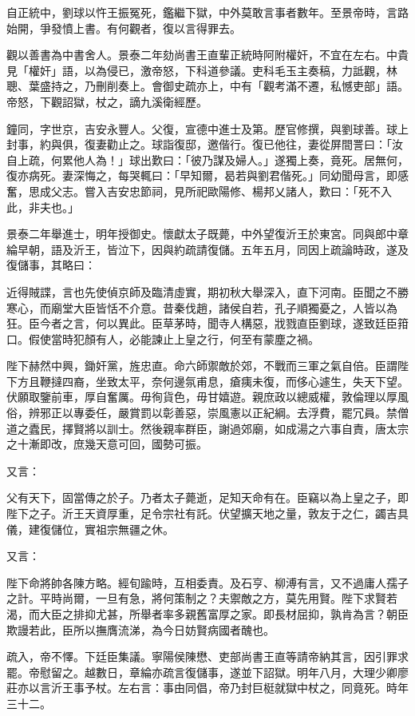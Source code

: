 \begin{pinyinscope}
自正統中，劉球以忤王振冤死，鑑繼下獄，中外莫敢言事者數年。至景帝時，言路始開，爭發憤上書。有何觀者，復以言得罪去。

觀以善書為中書舍人。景泰二年劾尚書王直輩正統時阿附權奸，不宜在左右。中貴見「權奸」語，以為侵已，激帝怒，下科道參議。吏科毛玉主奏稿，力詆觀，林聰、葉盛持之，乃刪削奏上。會御史疏亦上，中有「觀考滿不遷，私憾吏部」語。帝怒，下觀詔獄，杖之，謫九溪衛經歷。

鐘同，字世京，吉安永豐人。父復，宣德中進士及第。歷官修撰，與劉球善。球上封事，約與俱，復妻勸止之。球詣復邸，邀偕行。復已他往，妻從屏間詈曰：「汝自上疏，何累他人為！」球出歎曰：「彼乃謀及婦人。」遂獨上奏，竟死。居無何，復亦病死。妻深悔之，每哭輒曰：「早知爾，曷若與劉君偕死。」同幼聞母言，即感奮，思成父志。嘗入吉安忠節祠，見所祀歐陽修、楊邦乂諸人，歎曰：「死不入此，非夫也。」

景泰二年舉進士，明年授御史。懷獻太子既薨，中外望復沂王於東宮。同與郎中章綸早朝，語及沂王，皆泣下，因與約疏請復儲。五年五月，同因上疏論時政，遂及復儲事，其略曰：

近得賊諜，言也先使偵京師及臨清虛實，期初秋大舉深入，直下河南。臣聞之不勝寒心，而廟堂大臣皆恬不介意。昔秦伐趙，諸侯自若，孔子順獨憂之，人皆以為狂。臣今者之言，何以異此。臣草茅時，聞寺人構惡，戕戮直臣劉球，遂致廷臣箝口。假使當時犯顏有人，必能諫止上皇之行，何至有蒙塵之禍。

陛下赫然中興，鋤奸黨，旌忠直。命六師禦敵於郊，不戰而三軍之氣自倍。臣謂陛下方且鞭撻四裔，坐致太平，奈何邊氛甫息，瘡痍未復，而侈心遽生，失天下望。伏願取鑒前車，厚自奮厲。毋徇貨色，毋甘嬉遊。親庶政以總威權，敦倫理以厚風俗，辨邪正以專委任，嚴賞罰以彰善惡，崇風憲以正紀綱。去浮費，罷冗員。禁僧道之蠹民，擇賢將以訓士。然後親率群臣，謝過郊廟，如成湯之六事自責，唐太宗之十漸即改，庶幾天意可回，國勢可振。

又言：

父有天下，固當傳之於子。乃者太子薨逝，足知天命有在。臣竊以為上皇之子，即陛下之子。沂王天資厚重，足令宗社有託。伏望擴天地之量，敦友于之仁，蠲吉具儀，建復儲位，實祖宗無疆之休。

又言：

陛下命將帥各陳方略。經旬踰時，互相委責。及石亨、柳溥有言，又不過庸人孺子之計。平時尚爾，一旦有急，將何策制之？夫禦敵之方，莫先用賢。陛下求賢若渴，而大臣之排抑尤甚，所舉者率多親舊富厚之家。即長材屈抑，孰肯為言？朝臣欺謾若此，臣所以撫膺流涕，為今日妨賢病國者醜也。

疏入，帝不懌。下廷臣集議。寧陽侯陳懋、吏部尚書王直等請帝納其言，因引罪求罷。帝慰留之。越數日，章綸亦疏言復儲事，遂並下詔獄。明年八月，大理少卿廖莊亦以言沂王事予杖。左右言：事由同倡，帝乃封巨梃就獄中杖之，同竟死。時年三十二。


\end{pinyinscope}
